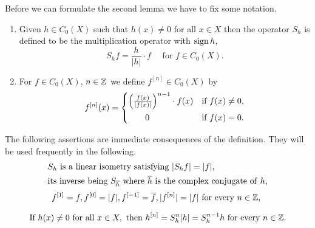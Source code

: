 Before we can formulate the second lemma we have to fix some notation.
\begin{definition}\label{def:b3-2.2}
\begin{enumerate}

\item
Given $h \in C_{0}(X)$ such that $h(x) \neq 0$ for all $x \in X$ then the operator $S_{h}$ is defined to be the multiplication operator with $ \operatorname{sign} h $, \ie
		\begin{equation}\label{eq:b3-2.3}
			S_{h}f = \frac{h}{|h|}\cdot f \quad\text{ for } f \in C_{0}(X) .
		\end{equation}
		
\item
For $f \in C_{0}(X)$, $n \in \mathbb{Z}$ we define $f^{[n]} \in C_{0}(X)$ by
\begin{equation}\label{eq:b3-2.4}
	f^{[n]}(x) = 
	\begin{cases}
        \mleft(\frac{f(x)}{|f(x)|}\mright)^{n-1}
        \cdot f(x) & \text{if } f(x) \neq 0 , \\			
			\qquad 0 \rule{0ex}{3ex}& \text{if } f(x) = 0.
			\end{cases}
\end{equation}
\end{enumerate}
\end{definition}
The following assertions are immediate consequences of the definition. 
They will be used frequently in the following.
\begin{equation}\label{eq:b3-2.5}
	\begin{split}
		&S_{h} \text{  is a linear isometry satisfying  } |S_{h}f| = |f|, \\ 
		&\text{its inverse being  } S_{\overline{h}} \text{  where  } \overline{h} \text{ is the complex conjugate of\/ $ h $,}
	\end{split}
\end{equation}
\begin{equation}\label{eq:b3-2.6}
	    f^{[1]} = f, f^{[0]} = |f|, f^{[-1]} = \overline{f}, |f^{[n]}| = |f| \text{  for every $n \in \mathbb{Z}$, }
\end{equation}
\begin{equation}\label{eq:b3-2.7}\rule{0ex}{3ex}
	\text{If  } h(x) \neq 0 \text{  for all  } x \in X, \text{  then  } h^{[n]} = S_{h}^{n}|h| = S_{h}^{n-1}h
	\text{  for every $ n \in \Z $.} 
\end{equation}
